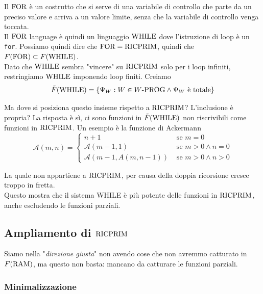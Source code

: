 Il $\text{FOR}$ è un costrutto che si serve di una variabile di controllo che parte da un preciso valore e arriva a un valore limite, senza che la variabile di controllo venga toccata. \\

Il $\text{FOR}$ language è quindi un linguaggio $\text{WHILE}$ dove l'istruzione di loop è un \texttt{for}. Possiamo quindi dire che $\text{FOR} = \text{RICPRIM}$, quindi che $F(\text{FOR}) \subset F(\text{WHILE})$.\\

Dato che $\text{WHILE}$ sembra "vincere" su $\text{RICPRIM}$ solo per i loop infiniti, restringiamo $\text{WHILE}$ imponendo loop finiti. Creiamo
$$ \tilde F (\text{WHILE}) = \{ \Psi_W: W \in W\text{-PROG} \wedge \Psi_W \text{ è totale}\}$$

Ma dove si posiziona questo insieme rispetto a $\text{RICPRIM}$? L'inclusione è propria? La risposta è sì, ci sono funzioni in $\tilde F (\text{WHILE})$ non riscrivibili come funzioni in $\text{RICPRIM}$. Un esempio è la funzione di Ackermann
$$ 
\mathcal{A} (m,n) = \begin{cases}
	n + 1 & \text{ se } m = 0 \\
	\mathcal{A}(m-1, 1) & \text{ se } m > 0 \wedge n = 0 \\
	\mathcal{A}(m-1, A(m, n-1)) & \text{ se } m > 0 \wedge n > 0
\end{cases}
$$

La quale non appartiene a $\text{RICPRIM}$, per causa della doppia ricorsione cresce troppo in fretta. \\

Questo mostra che il sistema WHILE è più potente delle funzioni in $\text{RICPRIM}$, anche escludendo le funzioni parziali.\\

\subsection{Ampliamento di $\text{RICPRIM}$}
Siamo nella "\textit{direzione giusta}" non avendo cose che non avremmo catturato in $F(\text{RAM})$, ma questo non basta: mancano da catturare le funzioni parziali.

\begin{center}
	\scalebox{0.8}{}
\end{center}

\subsubsection{Minimalizzazione}

